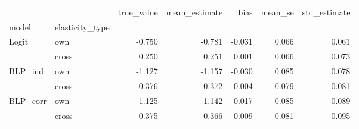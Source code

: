 \begin{tabular}{llrrrrr}
\toprule
 &  & true_value & mean_estimate & bias & mean_se & std_estimate \\
model & elasticity_type &  &  &  &  &  \\
\midrule
\multirow[t]{2}{*}{Logit} & own & -0.750 & -0.781 & -0.031 & 0.066 & 0.061 \\
 & cross & 0.250 & 0.251 & 0.001 & 0.066 & 0.073 \\
\cline{1-7}
\multirow[t]{2}{*}{BLP_ind} & own & -1.127 & -1.157 & -0.030 & 0.085 & 0.078 \\
 & cross & 0.376 & 0.372 & -0.004 & 0.079 & 0.081 \\
\cline{1-7}
\multirow[t]{2}{*}{BLP_corr} & own & -1.125 & -1.142 & -0.017 & 0.085 & 0.089 \\
 & cross & 0.375 & 0.366 & -0.009 & 0.081 & 0.095 \\
\cline{1-7}
\bottomrule
\end{tabular}

